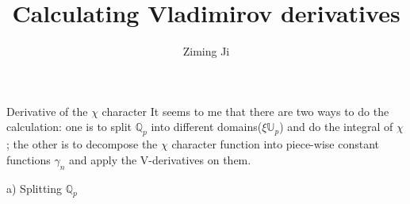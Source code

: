 \documentclass[12pt]{article}
\begin{document}
 
\title{Calculating Vladimirov derivatives}
\author{Ziming Ji}
 
\maketitle
 
\begin{section}{Derivative of the $\chi$ character}
It seems to me that there are two ways to do the calculation: one is to split $\mathbb{Q}_p$ into different domains($\xi \mathbb{U}_p$) and do the integral of $\chi$; the other is to decompose the $\chi$ character function into piece-wise constant functions $\gamma_n$ and apply the V-derivatives on them.

\begin{paragraph}{a) Splitting $\mathbb{Q}_p$}


\end{paragraph}
\end{section}
\end{document}
